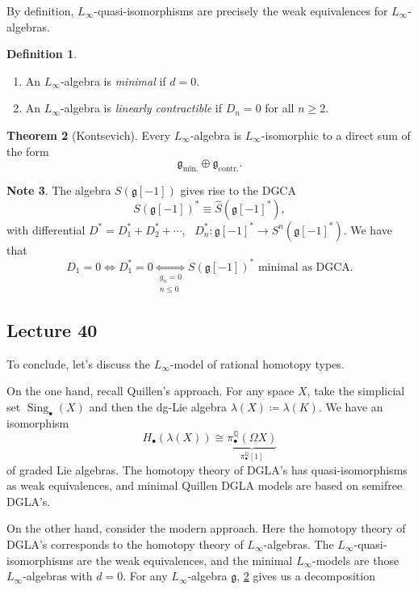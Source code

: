 \documentclass[10pt,letterpaper,cm]{nupset}
\theoremstyle{definition}
\newtheorem{defn}{Definition}[subsection]
\newtheorem{note}[defn]{Note}
\theoremstyle{theorem}
\newtheorem{theorem}[defn]{Theorem}
\theoremstyle{remark}
\newcommand{\Q}{\mathbb Q}
\newcommand{\1}{\mathbb{1}}
\newcommand{\0}{\vec 0}
\DeclareMathOperator{\sing}{Sing}
\newcommand{\be}{\begin{enumerate}}
\newcommand{\ee}{\end{enumerate}}
\begin{document}
By definition, $L_{\infty}$-quasi-isomorphisms are precisely the weak equivalences for $L_{\infty}$-algebras. 

\begin{defn} $ $
\be
\item   An $L_{\infty}$-algebra is \textit{minimal} if $d=0$.
\item  An $L_{\infty}$-algebra is \textit{linearly contractible} if $D_n =0$ for all $n\geq 2$.
\ee
\end{defn}

\begin{theorem}[Kontsevich]\label{Konts}
Every $L_{\infty}$-algebra is $L_{\infty}$-isomorphic to a direct sum of the form
\[
\mathfrak{g}_{\text{min.}} \oplus \mathfrak{g}_{\text{contr.}}.
\]
\end{theorem}

\begin{note}
The algebra  $S(\mathfrak{g}\left[{-1}\right])$ gives rise to the DGCA 
\[
S(\mathfrak{g}\left[{-1}\right])^{\ast} \equiv \hat{S}(\mathfrak{g}\left[{-1}\right]^{\ast})
,\]
with differential $D^{\ast} = D_1^{\ast} + D_2^{\ast} + \cdots$, \ $D_n^{\ast} : \mathfrak{g}\left[{-1}\right]^{\ast} \to S^n(\mathfrak{g}\left[{-1}\right]^{\ast})$. We have that
\[
D_1 = 0 \iff D_1^{\ast} =0 \underset{\substack{g_n =0 \\ n \leq 0}}{\iff} \text{$S(\mathfrak{g}\left[{-1}\right])^{\ast}$ minimal as DGCA}
.\]
\end{note}

\subsection{Lecture 40}

To conclude, let's discuss the $L_{\infty}$-model of rational homotopy types.

\medskip

On the one hand, recall Quillen's approach. For any space $X$, take the simplicial set $\sing_{\bullet}(X)$ and then the dg-Lie algebra $\lambda(X) \coloneqq \lambda(K)$. We have an isomorphism
\[
H_{\bullet}(\lambda(X)) \cong \underbrace{\pi_{\bullet}^{\Q}(\Omega{X})}_{\pi_{\bullet}^{\Q}\left[1\right]}
\]
of graded Lie algebras. The homotopy theory of DGLA's has quasi-isomorphisms as weak equivalences, and minimal Quillen DGLA models are based on semifree DGLA's.

\medskip

On the other hand, consider the modern approach. Here the homotopy theory of DGLA's corresponds to the homotopy theory of $L_{\infty}$-algebras. The $L_{\infty}$-quasi-isomorphisms are the weak equivalences, and the minimal $L_{\infty}$-models are those $L_{\infty}$-algebras with $d=0$. For any $L_{\infty}$-algebra $\mathfrak{g}$, \cref{Konts} gives us a decomposition
\end{document}
